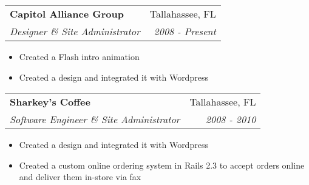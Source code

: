 \documentclass[letterpaper,11pt]{article}
\makeatletter
\newcommand{\resitem}[1]{\item #1 \vspace{-2pt}}
\newcommand{\ressubheading}[4]{
\begin{tabular*}{7.0in}{l@{\extracolsep{\fill}}r}
		\textbf{#1} & #2 \\
		\textit{#3} & \textit{#4} \\
\end{tabular*}\vspace{-6pt}}
\makeatother
\begin{document}
\ressubheading{Capitol Alliance Group}{Tallahassee, FL}{Designer \& Site Administrator}{2008 - Present}
\begin{itemize} 
        \resitem{Created a Flash intro animation}
        \resitem{Created a design and integrated it with Wordpress}
\end{itemize}

\ressubheading{Sharkey's Coffee}{Tallahassee, FL}{Software Engineer \& Site Administrator}{2008 - 2010}
\begin{itemize} 
        \resitem{Created a design and integrated it with Wordpress}
        \resitem{Created a custom online ordering system in Rails 2.3 to accept orders online and deliver them in-store via fax}
\end{itemize}
\end{document}
